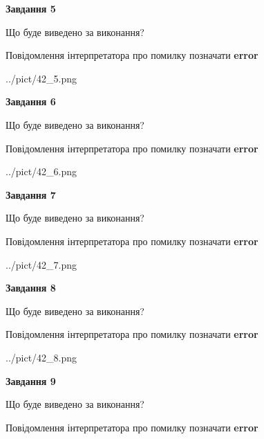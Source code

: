 \documentclass[11pt, ukrainian]{article}
\begin{document}
{\begin {large}
{\begin {center}\textbf{Завдання 5}\end {center}}\par
Що буде виведено за виконання? \par
Повідомлення інтерпретатора про помилку позначати \textbf{error}

\begin{center}
	{../pict/42_5.png}
\end{center}
\newpage

{\begin {center}\textbf{Завдання 6}\end {center}}\par
Що буде виведено за виконання? \par
Повідомлення інтерпретатора про помилку позначати \textbf{error}

\begin{center}
	{../pict/42_6.png}
\end{center}
\newpage

{\begin {center}\textbf{Завдання 7}\end {center}}\par
Що буде виведено за виконання? \par
Повідомлення інтерпретатора про помилку позначати \textbf{error}

\begin{center}
	{../pict/42_7.png}
\end{center}
\newpage

{\begin {center}\textbf{Завдання 8}\end {center}}\par
Що буде виведено за виконання? \par
Повідомлення інтерпретатора про помилку позначати \textbf{error}

\begin{center}
	{../pict/42_8.png}
\end{center}
\newpage

{\begin {center}\textbf{Завдання 9}\end {center}}\par
Що буде виведено за виконання? \par
Повідомлення інтерпретатора про помилку позначати \textbf{error}


\end{large}}
\end{document}
